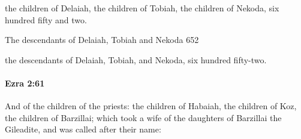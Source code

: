 			\begin{versebox}
					\item[BHS] 
					\item[LXX] 
					\item[ASV] the children of Delaiah, the children of Tobiah, the children of Nekoda, six hundred fifty and two.
					\item[NIV] The descendants of Delaiah, Tobiah and Nekoda 652
					\item[NRSV] the descendants of Delaiah, Tobiah, and Nekoda, six hundred fifty-two.
			\end{versebox}

		\paragraph{Ezra 2:61} %
			\label{EZRA-2-61}

			And of the children of the priests: the children of Habaiah, the children of Koz, the children of Barzillai; which took a wife of the daughters of Barzillai the Gileadite, and was called after their name:

